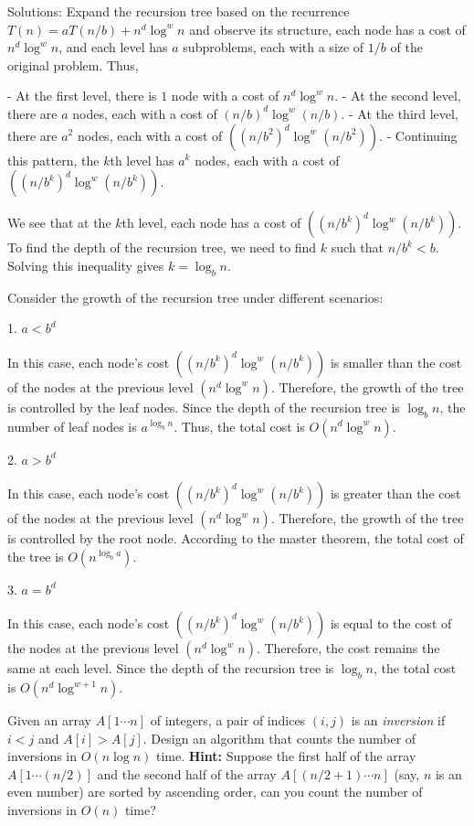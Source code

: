 \documentclass{oxmathproblems}
\begin{document}
\begin{questions}
Solutions:
Expand the recursion tree based on the recurrence $T(n) = aT(n/b) + n^d\log^w n$ and observe its structure, each node has a cost of $n^d\log^w n$, and each level has $a$ subproblems, each with a size of $1/b$ of the original problem. Thus,

- At the first level, there is $1$ node with a cost of $n^d\log^w n$.\newline
- At the second level, there are $a$ nodes, each with a cost of $(n/b)^d\log^w(n/b)$.\newline
- At the third level, there are $a^2$ nodes, each with a cost of $((n/b^2)^d\log^w(n/b^2))$.\newline
- Continuing this pattern, the $k$th level has $a^k$ nodes, each with a cost of $((n/b^k)^d\log^w(n/b^k))$.\newline

We see that at the $k$th level, each node has a cost of $((n/b^k)^d\log^w(n/b^k))$. To find the depth of the recursion tree, we need to find $k$ such that $n/b^k < b$. Solving this inequality gives $k = \log_b n$.

Consider the growth of the recursion tree under different scenarios:

1. $a < b^d$

In this case, each node's cost $((n/b^k)^d\log^w(n/b^k))$ is smaller than the cost of the nodes at the previous level $(n^d\log^w n)$. Therefore, the growth of the tree is controlled by the leaf nodes. Since the depth of the recursion tree is $\log_b n$, the number of leaf nodes is $a^{\log_b n}$. Thus, the total cost is $O(n^d\log^w n)$.

2. $a > b^d$

In this case, each node's cost $((n/b^k)^d\log^w(n/b^k))$ is greater than the cost of the nodes at the previous level $(n^d\log^w n)$. Therefore, the growth of the tree is controlled by the root node. According to the master theorem, the total cost of the tree is $O(n^{\log_b a})$.

3. $a = b^d$

In this case, each node's cost $((n/b^k)^d\log^w(n/b^k))$ is equal to the cost of the nodes at the previous level $(n^d\log^w n)$. Therefore, the cost remains the same at each level. Since the depth of the recursion tree is $\log_b n$, the total cost is $O(n^d\log^{w+1} n)$.

\miquestion[25]
Given an array $A[1\cdots n]$ of integers, a pair of indices $(i,j)$ is an \emph{inversion} if $i<j$ and $A[i]>A[j]$.
Design an algorithm that counts the number of inversions in $O(n\log n)$ time.
\textbf{Hint:} Suppose the first half of the array $A[1\cdots (n/2)]$ and the second half of the array $A[(n/2+1)\cdots n]$ (say, $n$ is an even number) are sorted by ascending order, can you count the number of inversions in $O(n)$ time?


\end{questions}
\end{document}
